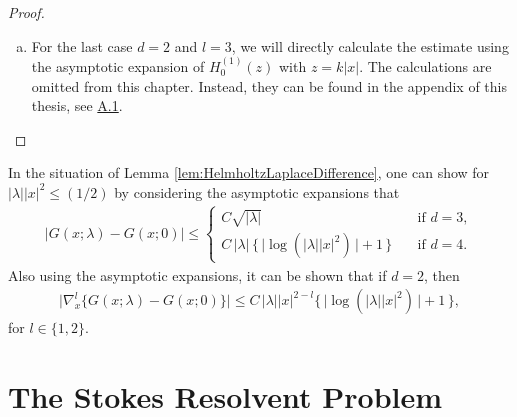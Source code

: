 \begin{proof}
\begin{enumerate}[(a)]
  \item For the last case $d = 2$ and $l = 3$, we will directly calculate the estimate using the asymptotic expansion of $H_0^{(1)}(z)$ with $z = k|x|$. The calculations are omitted from this chapter. Instead, they can be found in the appendix of this thesis, see \hyperref[sec:A1]{A.1}. \qedhere
%
  \end{enumerate} 
\end{proof}

\begin{rem}
  \label{rem:HelmholtzLaplaceDifference}
  In the situation of Lemma \ref{lem:HelmholtzLaplaceDifference}, one can show for $|\lambda| |x|^2 \leq (1/2)$ by considering the asymptotic expansions that 
  \begin{align*}
    |G(x; \lambda) - G(x; 0) | \leq \begin{cases}
      C \sqrt{|\lambda|} \quad&\text{if } d = 3, \\
      C\, |\lambda| \,\Big\{\, \big|\log(|\lambda| |x|^2) \,\big| + 1 \,\Big\} \quad&\text{if } d = 4.
    \end{cases}
  \end{align*}
  Also using the asymptotic expansions, it can be shown that if $d = 2$, then
  \begin{align*}
    \big|\nabla_x^l \{ G(x; \lambda) - G(x; 0) \} \big| \leq C\, |\lambda| |x|^{2 - l} \Big\{\, \big|\log(|\lambda| |x|^2 ) \,\big| + 1\, \Big\},
  \end{align*}
  for $l \in \{1, 2\}$.  
\end{rem}

\newpage
\section{The Stokes Resolvent Problem}
\label{sec:2.2}

